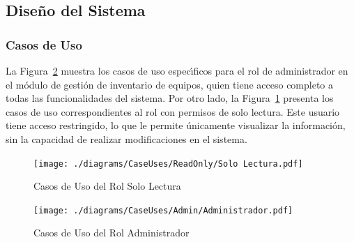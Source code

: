 \documentclass[stu, 12pt, letterpaper, donotrepeattitle, floatsintext, natbib]{apa7}
\begin{document}
\subsection{Dise\~{n}o del Sistema}
\subsubsection{Casos de Uso}
La Figura~\ref{admin} muestra los casos de uso espec\'{\i}ficos para el rol de administrador en el m\'odulo de gesti\'on de inventario de equipos, quien tiene acceso completo a todas las funcionalidades del sistema. Por otro lado,
la Figura~\ref{readonly} presenta los casos de uso correspondientes al rol con permisos de solo lectura. Este usuario tiene acceso restringido, lo que le permite \'unicamente visualizar la informaci\'on, sin la capacidad de realizar modificaciones en el sistema.
\begin{figure}[H]
    \centering
    \caption{Casos de Uso del Rol Solo Lectura}\label{readonly}
    \texttt{[image: ./diagrams/CaseUses/ReadOnly/Solo Lectura.pdf]}
\end{figure}
\begin{figure}[H]
    \centering
    \caption{Casos de Uso del Rol Administrador}\label{admin}
    \texttt{[image: ./diagrams/CaseUses/Admin/Administrador.pdf]}
\end{figure}
\end{document}
